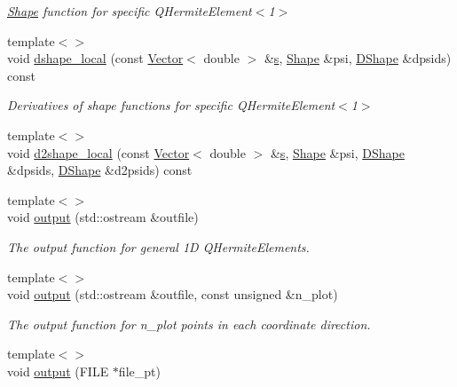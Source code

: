 \begin{DoxyCompactItemize}
\begin{DoxyCompactList}\small\item\em \hyperlink{classoomph_1_1Shape}{Shape} function for specific Q\+Hermite\+Element$<$1$>$ \end{DoxyCompactList}\item 
{\footnotesize template$<$$>$ }\\void \hyperlink{classoomph_1_1QHermiteElement_a4b734edf4d55bc795fca98845609fa55}{dshape\+\_\+local} (const \hyperlink{classoomph_1_1Vector}{Vector}$<$ double $>$ \&\hyperlink{cfortran_8h_ab7123126e4885ef647dd9c6e3807a21c}{s}, \hyperlink{classoomph_1_1Shape}{Shape} \&psi, \hyperlink{classoomph_1_1DShape}{D\+Shape} \&dpsids) const
\begin{DoxyCompactList}\small\item\em Derivatives of shape functions for specific Q\+Hermite\+Element$<$1$>$ \end{DoxyCompactList}\item 
{\footnotesize template$<$$>$ }\\void \hyperlink{classoomph_1_1QHermiteElement_aaaaf8865ec4b0982be8520508d92f5be}{d2shape\+\_\+local} (const \hyperlink{classoomph_1_1Vector}{Vector}$<$ double $>$ \&\hyperlink{cfortran_8h_ab7123126e4885ef647dd9c6e3807a21c}{s}, \hyperlink{classoomph_1_1Shape}{Shape} \&psi, \hyperlink{classoomph_1_1DShape}{D\+Shape} \&dpsids, \hyperlink{classoomph_1_1DShape}{D\+Shape} \&d2psids) const
\item 
{\footnotesize template$<$$>$ }\\void \hyperlink{classoomph_1_1QHermiteElement_a07dd8f6d5fbb05e8b910b0d2e52a38aa}{output} (std\+::ostream \&outfile)
\begin{DoxyCompactList}\small\item\em The output function for general 1D Q\+Hermite\+Elements. \end{DoxyCompactList}\item 
{\footnotesize template$<$$>$ }\\void \hyperlink{classoomph_1_1QHermiteElement_a1b31b1c4c9ebff1debdf069dc8fa976d}{output} (std\+::ostream \&outfile, const unsigned \&n\+\_\+plot)
\begin{DoxyCompactList}\small\item\em The output function for n\+\_\+plot points in each coordinate direction. \end{DoxyCompactList}\item 
{\footnotesize template$<$$>$ }\\void \hyperlink{classoomph_1_1QHermiteElement_ad46a3ab51b36d24c7bf101f52722bf4f}{output} (F\+I\+LE $\ast$file\+\_\+pt)

\end{DoxyCompactItemize}
